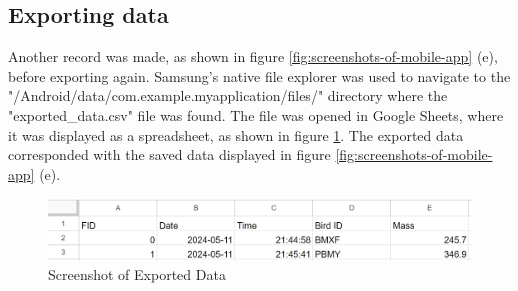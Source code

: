 \documentclass[class=report,11pt,crop=false]{standalone}
\begin{document}
		\subsection{Exporting data}
			Another record was made, as shown in figure \ref{fig:screenshots-of-mobile-app} (e), before exporting again. Samsung's native file explorer was used to navigate to the "/Android/data/com.example.myapplication/files/" directory where the	"exported\_data.csv" file was found. The file was opened in Google Sheets, where it was displayed as a spreadsheet, as shown in figure \ref{fig:exported-data}. The exported data corresponded with the saved data displayed in figure \ref{fig:screenshots-of-mobile-app} (e).
		
			\begin{figure}[h!]
				\centering
				\includegraphics[width=0.7\linewidth]{"Figures/Exported Data"}
				\caption{Screenshot of Exported Data}
				\label{fig:exported-data}
			\end{figure}
			
	
	

	
	\ifstandalone
	
	\printnoidxglossary[type=\acronymtype,nonumberlist]
	\fi
\end{document}
